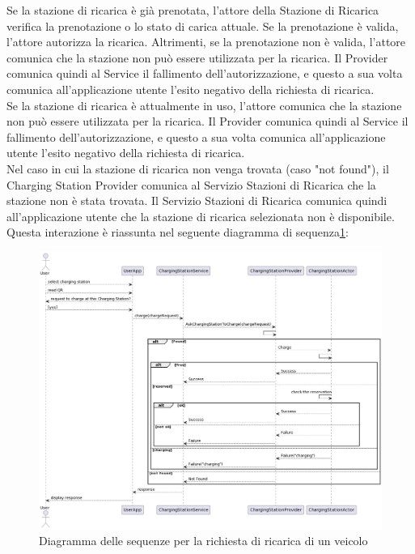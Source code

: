 Se la stazione di ricarica è già prenotata, l'attore della Stazione di Ricarica verifica
la prenotazione o lo stato di carica attuale. Se la prenotazione è valida, l'attore
autorizza la ricarica. Altrimenti, se la prenotazione non è valida, l'attore comunica
che la stazione non può essere utilizzata per la ricarica. Il Provider comunica quindi
al Service il fallimento dell'autorizzazione, e questo a sua volta comunica all'applicazione
utente l'esito negativo della richiesta di ricarica.\\

Se la stazione di ricarica è attualmente in uso, l'attore comunica che la stazione non può
essere utilizzata per la ricarica. Il Provider comunica quindi al Service il fallimento
dell'autorizzazione, e questo a sua volta comunica all'applicazione utente l'esito negativo
della richiesta di ricarica.\\

Nel caso in cui la stazione di ricarica non venga trovata (caso "not found"), il Charging Station Provider
comunica al Servizio Stazioni di Ricarica che la stazione non è stata trovata.
Il Servizio Stazioni di Ricarica comunica quindi all'applicazione utente che la stazione di
ricarica selezionata non è disponibile.\\

Questa interazione è riassunta nel seguente diagramma di sequenza\ref{fig:charge}:

\begin{figure}[!htbp]
    \centering
    \includegraphics[width=\textwidth]{images/charge.png}
    \caption{Diagramma delle sequenze per la richiesta di ricarica di un veicolo}
    \label{fig:charge}
\end{figure}
\clearpage

